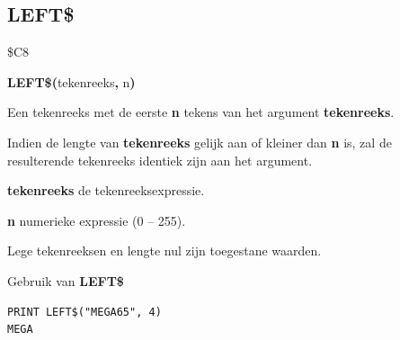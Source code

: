 \subsection{LEFT\$}
\begin{description}[leftmargin=2cm,style=nextline]
\item [Token:]    \$C8

\item [Formaat:]   {\bf LEFT\$(}tekenreeks{\bf,} n{\bf)}

\item [Retourneert:]  Een tekenreeks met de eerste {\bf n} tekens van het argument {\bf tekenreeks}.

Indien de lengte van {\bf tekenreeks} gelijk aan of kleiner dan {\bf n} is, zal de resulterende tekenreeks identiek zijn aan het argument.

                  {\bf tekenreeks} de tekenreeksexpressie.

                  {\bf n} numerieke expressie (0 -- 255).

\item [Opmerkingen:]  Lege tekenreeksen en lengte nul zijn toegestane waarden.

\item [Voorbeeld:]  Gebruik van {\bf LEFT\$}

\begin{tcolorbox}[colback=black,coltext=white]
\verbatimfont{\codefont}
\begin{verbatim}
PRINT LEFT$("MEGA65", 4)
MEGA
\end{verbatim}
\end{tcolorbox}
\end{description}


\newpage
